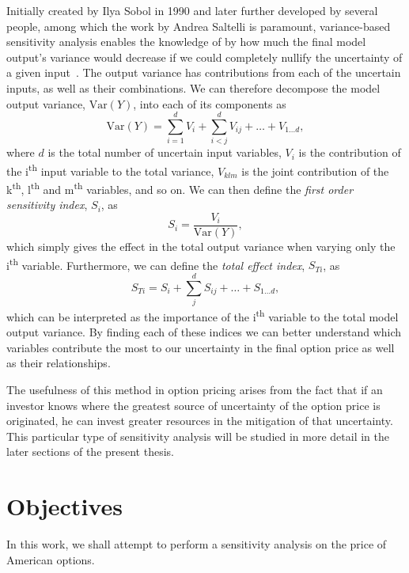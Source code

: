\documentclass[a4paper,twocolumn,aps,prd,longbibliography,superscriptaddress]{revtex4-1}
\begin{document}
Initially created by Ilya Sobol in 1990 and later further developed by several people, among which the work by Andrea Saltelli is paramount, variance-based sensitivity analysis enables the knowledge of by how much the final model output's variance would decrease if we could completely nullify the uncertainty of a given input~\cite{Saltelli,Sobol}.
The output variance has contributions from each of the uncertain inputs, as well as their combinations. We can therefore decompose the model output variance, $\mathrm{Var}(Y)$, into each of its components as
\begin{equation}
\mathrm{Var}(Y)=\sum_{i=1}^dV_i+\sum_{i<j}^dV_{ij}+\dots+V_{1\dots d},
\end{equation}
\noindent where $d$ is the total number of uncertain input variables, $V_{i}$ is the contribution of the i\textsuperscript{th} input variable to the total variance, $V_{klm}$ is the joint contribution of the k\textsuperscript{th}, l\textsuperscript{th} and m\textsuperscript{th} variables, and so on.
We can then define the \textit{first order sensitivity index}, $S_i$, as
\begin{equation}\label{Si}
S_i=\frac{V_i}{\mathrm{Var}(Y)},
\end{equation}
\noindent which simply gives the effect in the total output variance when varying only the i\textsuperscript{th} variable.
Furthermore, we can define the \textit{total effect index}, $S_{Ti}$, as
\begin{equation}\label{STi}
S_{Ti}=S_i+\sum_{j}^dS_{ij}+\dots+S_{1\dots d},
\end{equation}
\noindent which can be interpreted as the importance of the i\textsuperscript{th} variable to the total model output variance.
By finding each of these indices we can better understand which variables contribute the most to our uncertainty in the final option price as well as their relationships.

The usefulness of this method in option pricing arises from the fact that if an investor knows where the greatest source of uncertainty of the option price is originated, he can invest greater resources in the mitigation of that uncertainty.
This particular type of sensitivity analysis will be studied in more detail in the later sections of the present thesis.



\section{Objectives}
In this work, we shall attempt to perform a sensitivity analysis on the price of American options.
\end{document}
